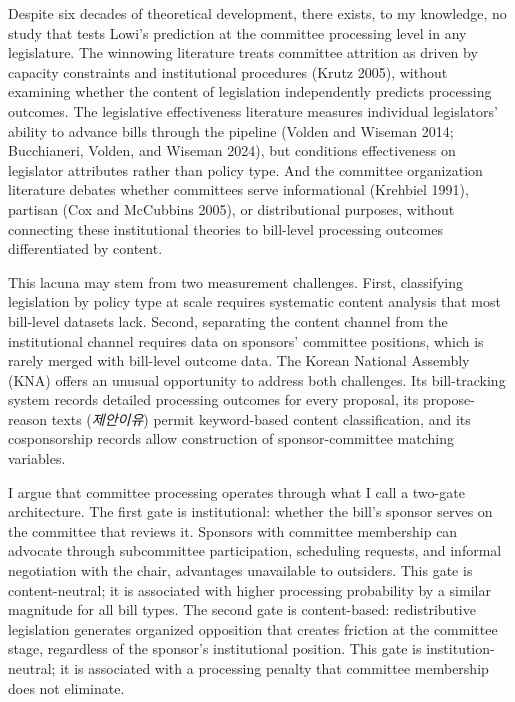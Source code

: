 \documentclass[11pt]{article}
\begin{document}
Despite six decades of theoretical development, there exists, to my knowledge, no study that tests Lowi's prediction at the committee processing level in any legislature. The winnowing literature treats committee attrition as driven by capacity constraints and institutional procedures (Krutz 2005), without examining whether the content of legislation independently predicts processing outcomes. The legislative effectiveness literature measures individual legislators' ability to advance bills through the pipeline (Volden and Wiseman 2014; Bucchianeri, Volden, and Wiseman 2024), but conditions effectiveness on legislator attributes rather than policy type. And the committee organization literature debates whether committees serve informational (Krehbiel 1991), partisan (Cox and McCubbins 2005), or distributional purposes, without connecting these institutional theories to bill-level processing outcomes differentiated by content.

This lacuna may stem from two measurement challenges. First, classifying legislation by policy type at scale requires systematic content analysis that most bill-level datasets lack. Second, separating the content channel from the institutional channel requires data on sponsors' committee positions, which is rarely merged with bill-level outcome data. The Korean National Assembly (KNA) offers an unusual opportunity to address both challenges. Its bill-tracking system records detailed processing outcomes for every proposal, its propose-reason texts (\emph{제안이유}) permit keyword-based content classification, and its cosponsorship records allow construction of sponsor-committee matching variables.

I argue that committee processing operates through what I call a two-gate architecture. The first gate is institutional: whether the bill's sponsor serves on the committee that reviews it. Sponsors with committee membership can advocate through subcommittee participation, scheduling requests, and informal negotiation with the chair, advantages unavailable to outsiders. This gate is content-neutral; it is associated with higher processing probability by a similar magnitude for all bill types. The second gate is content-based: redistributive legislation generates organized opposition that creates friction at the committee stage, regardless of the sponsor's institutional position. This gate is institution-neutral; it is associated with a processing penalty that committee membership does not eliminate.
\end{document}
